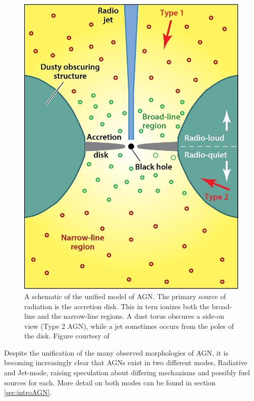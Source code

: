 \begin{figure}
	\centering
	\includegraphics[width=\textwidth]{introduction/unifiedAGN.jpeg}
	\caption[Schematic of unified model of AGN]{A schematic of the unified model of AGN. The primary source of radiation is the accretion disk. This in tern ionizes both the broad-line and the narrow-line regions. A dust torus obscures a side-on view (Type 2 AGN), while a jet sometimes occurs from the poles of the disk. Figure courtesy of \citet{Heckman2014}}
	\label{fig:unifiedAGN}
\end{figure}

Despite the unification of the many observed morphologies of AGN, it is becoming increasingly clear that AGNs exist in two different modes, Radiative and Jet-mode, raising speculation about differing mechanisms and possibly fuel sources for each. More detail on both modes can be found in section \ref{sec:introAGN}. 

